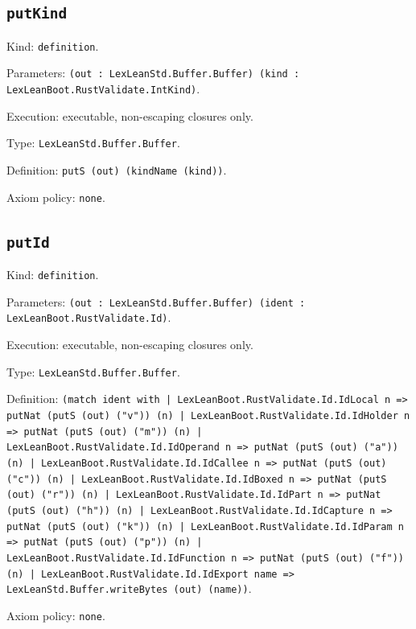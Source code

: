 \documentclass[11pt]{article}
\begin{document}
\subsection*{\texttt{putKind}}
\noindent Kind: \texttt{definition}.\par
\noindent Parameters: \texttt{(out : LexLeanStd.Buffer.Buffer) (kind : LexLeanBoot.RustValidate.IntKind)}.\par
\noindent Execution: executable, non-escaping closures only.\par
\noindent Type: \texttt{LexLeanStd.Buffer.Buffer}.\par
\noindent Definition: \texttt{putS (out) (kindName (kind))}.\par
\noindent Axiom policy: \texttt{none}.\par
\subsection*{\texttt{putId}}
\noindent Kind: \texttt{definition}.\par
\noindent Parameters: \texttt{(out : LexLeanStd.Buffer.Buffer) (ident : LexLeanBoot.RustValidate.Id)}.\par
\noindent Execution: executable, non-escaping closures only.\par
\noindent Type: \texttt{LexLeanStd.Buffer.Buffer}.\par
\noindent Definition: \texttt{(match ident with | LexLeanBoot.RustValidate.Id.IdLocal n => putNat (putS (out) ("v")) (n) | LexLeanBoot.RustValidate.Id.IdHolder n => putNat (putS (out) ("m")) (n) | LexLeanBoot.RustValidate.Id.IdOperand n => putNat (putS (out) ("a")) (n) | LexLeanBoot.RustValidate.Id.IdCallee n => putNat (putS (out) ("c")) (n) | LexLeanBoot.RustValidate.Id.IdBoxed n => putNat (putS (out) ("r")) (n) | LexLeanBoot.RustValidate.Id.IdPart n => putNat (putS (out) ("h")) (n) | LexLeanBoot.RustValidate.Id.IdCapture n => putNat (putS (out) ("k")) (n) | LexLeanBoot.RustValidate.Id.IdParam n => putNat (putS (out) ("p")) (n) | LexLeanBoot.RustValidate.Id.IdFunction n => putNat (putS (out) ("f")) (n) | LexLeanBoot.RustValidate.Id.IdExport name => LexLeanStd.Buffer.writeBytes (out) (name))}.\par
\noindent Axiom policy: \texttt{none}.\par
\end{document}
